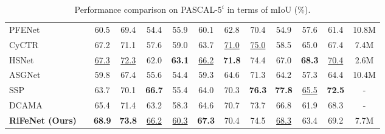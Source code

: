 \documentclass[letterpaper]{article} %
\begin{document}
\begin{table}[!t]
\begin{threeparttable}
{\begin{tabular}{l|c|ccccc|ccccc|c}
PFENet~\citeyear{tian2020prior}   	& 						 	&60.5&69.4&54.4&55.9&60.1	&62.8&70.4&54.9&57.6&61.4	&10.8M\\
CyCTR~\citeyear{zhang2021few}  	&							&67.2&71.1&57.6&59.0&63.7 &\underline{71.0}&\underline{75.0}&58.5&65.0&67.4	&7.4M\\
HSNet~\citeyear{tao2020hierarchical}    	& 							&\underline{67.3}&\underline{72.3}&62.0&\textbf{63.1}&\underline{66.2}	&\textbf{71.8}&74.4&67.0&\textbf{68.3}&\underline{70.4}	&2.6M\\
ASGNet~\citeyear{li2021adaptive}		&							&59.8&67.4&55.6&54.4&59.3	&64.6&71.3&64.2&57.3&64.4&10.4M\\
SSP~\citeyear{fan2022self}		&							&63.7&70.1&\textbf{66.7}&55.4&64.0  &70.3&\textbf{76.3}&\textbf{77.8}&\underline{65.5}&\textbf{72.5}&-	\\
DCAMA~\citeyear{shi2022dense}		&							&65.4&71.4&63.2&58.3&64.6	&70.7&73.7&66.8&61.9&68.3&-	\\
\textbf{RiFeNet (Ours)}&							&\textbf{68.9}&\textbf{73.8}&\underline{66.2}&\underline{60.3}&\textbf{67.3}	&70.4&74.5&\underline{68.3}&63.4&69.2&7.7M\\
\bottomrule[1pt]
\end{tabular}}
\end{threeparttable}
\caption{Performance comparison on PASCAL-$5^i$ in terms of mIoU ($\%$).}
\label{sotapascal}
\end{table}
\end{document}
